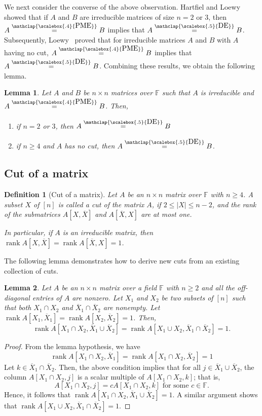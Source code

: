 \documentclass[11pt,letterpaper]{article}
\DeclareMathOperator*{\rank}{rank}
\newcommand{\comp}[1]{\overline{#1}}
\newcommand{\F}{\mathbb{F}}
\newtheorem{lemma}{Lemma}[section]
\newtheorem{definition}{Definition}[section]
\newcommand{\DE}{\stackrel{\mathclap{\scalebox{.5}{\mbox{DE}}}}{=}}
\newcommand{\PME}{\stackrel{\mathclap{\scalebox{.4}{\mbox{PME}}}}{=}}
\begin{document}
{{{We next consider the converse of the above observation. Hartfiel and Loewy~\cite[Theorem~3]{Hartfiell84} showed that if $A$ and $B$ are irreducible matrices of size $n=2$ or $3$, then $A\PME B$ implies that $A\DE B$. Subsequently, Loewy~\cite[Theorem~1]{Loewy86} proved that for irreducible matrices $A$ and $B$ with $A$ having no cut, $A\PME B$ implies that $A\DE B$. Combining these results, we obtain the following lemma.
\begin{lemma}
\label{lem:no-cut-to-PME}
Let $A$ and $B$ be $n\times n$ matrices over $\F$ such that $A$ is irreducible and $A\PME B$. Then, 
\begin{enumerate}
\item if $n=2$ or $3$, then $A\DE B$
\item if $n\geq 4$ and $A$ has no cut, then $A\DE B$.
\end{enumerate}
\end{lemma}

\subsection{Cut of a matrix}
\begin{definition}[Cut of a matrix]
\label{def:cut-of-matrix}
Let $A$ be an $n\times n$ matrix over $\F$ with $n\geq 4$. A subset $X$ of $[n]$ is called a \emph{cut} of the matrix $A$, if $2\leq |X|\leq n-2$, and the rank of the submatrices $A[X, \comp{X}]$ and $A[\comp{X}, X]$ are at most one.

In particular, if $A$ is an irreducible matrix, then $\rank A[X, \comp{X}]=\rank A[\comp{X}, X ]=1$.
\end{definition}

The following lemma demonstrates how to derive new cuts from an existing collection of cuts.
\begin{lemma}
\label{prop:old-to-new-cut}
Let $A$ be an $n\times n$ matrix over a field $\F$ with $n\geq 2$ and all the off-diagonal entries of $A$ are nonzero. Let $X_1$ and $X_2$ be two subsets of $[n]$ such that both $X_1\cap X_2$ and $\comp{X}_1\cap \comp{X}_2$ are nonempty. Let $\rank A[X_1, \comp{X}_1]=\rank A[X_2, \comp{X}_2]=1$. Then, $$\rank A[X_1\cap X_2, \comp{X}_1\cup \comp{X}_2]=\rank A[X_1\cup X_2, \comp{X}_1\cap \comp{X}_2]=1.$$
\end{lemma}
\begin{proof}
From the lemma hypothesis, we have $$\rank A[X_1\cap X_2, \comp{X}_1]=\rank A[X_1\cap X_2, \comp{X}_2]=1$$
Let $k\in \comp{X}_1\cap\comp{X}_2$. Then, the above condition implies that for all $j\in\comp{X}_1\cup\comp{X}_2$, the column $A[X_1\cap X_2, j]$ is a scalar multiple of $A[X_1\cap X_2, k]$; that is, $$A[X_1\cap X_2, j]=cA[X_1\cap X_2, k] \text{ for some }c\in\F.$$ Hence, it follows that $\rank A[X_1\cap X_2, \comp{X}_1\cup\comp{X}_2]=1$. A similar argument shows that $\rank A[X_1\cup X_2, \comp{X}_1\cap \comp{X}_2]=1.$
\end{proof}

}}}
\end{document}
